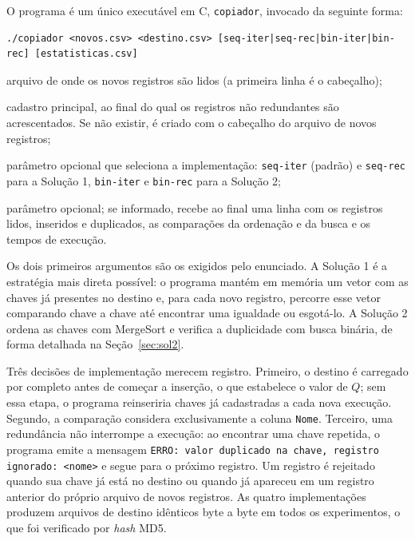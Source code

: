 \documentclass[11pt,a4paper]{article}
\begin{document}
O programa é um único executável em C, \texttt{copiador}, invocado da seguinte forma:

\begin{lstlisting}[style=cmd]
./copiador <novos.csv> <destino.csv> [seq-iter|seq-rec|bin-iter|bin-rec] [estatisticas.csv]
\end{lstlisting}

\begin{description}[leftmargin=1.2cm,style=nextline,itemsep=1pt]
  \item[\texttt{novos.csv}] arquivo de onde os novos registros são lidos (a primeira linha é o cabeçalho);
  \item[\texttt{destino.csv}] cadastro principal, ao final do qual os registros não redundantes são acrescentados. Se não existir, é criado com o cabeçalho do arquivo de novos registros;
  \item[\texttt{modo}] parâmetro opcional que seleciona a implementação: \texttt{seq-iter} (padrão) e \texttt{seq-rec} para a Solução 1, \texttt{bin-iter} e \texttt{bin-rec} para a Solução 2;
  \item[\texttt{estatisticas.csv}] parâmetro opcional; se informado, recebe ao final uma linha com os registros lidos, inseridos e duplicados, as comparações da ordenação e da busca e os tempos de execução.
\end{description}

Os dois primeiros argumentos são os exigidos pelo enunciado. A Solução 1 é a estratégia mais direta possível: o programa mantém em memória um vetor com as chaves já presentes no destino e, para cada novo registro, percorre esse vetor comparando chave a chave até encontrar uma igualdade ou esgotá-lo. A Solução 2 ordena as chaves com MergeSort e verifica a duplicidade com busca binária, de forma detalhada na Seção~\ref{sec:sol2}.

Três decisões de implementação merecem registro. Primeiro, o destino é carregado por completo antes de começar a inserção, o que estabelece o valor de $Q$; sem essa etapa, o programa reinseriria chaves já cadastradas a cada nova execução. Segundo, a comparação considera exclusivamente a coluna \texttt{Nome}. Terceiro, uma redundância não interrompe a execução: ao encontrar uma chave repetida, o programa emite a mensagem \texttt{ERRO: valor duplicado na chave, registro ignorado: <nome>} e segue para o próximo registro. Um registro é rejeitado quando sua chave já está no destino ou quando já apareceu em um registro anterior do próprio arquivo de novos registros. As quatro implementações produzem arquivos de destino idênticos byte a byte em todos os experimentos, o que foi verificado por \emph{hash} MD5.
\end{document}
